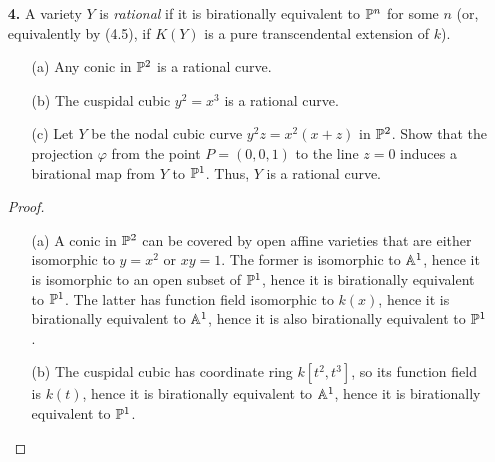 \documentclass{article}
\begin{document}
\begin{enumerate} [label=\textbf{\arabic*.}, leftmargin=0cm]
\begin{proof}
    If $\varphi : X \to Y$ is a rational map, then the set of open subsets of $X$ on which $\varphi$ is represented by morphism function is nonempty, and since $X$ is a noetherian space, there is a maximal element in this set. Then, the largest open subset $U$ of $X$ on which $\varphi$ is represented by a morphism is the union of maximal elements in this subset of open subsets.
\end{proof}

\item[\textbf{4.}] A variety $Y$ is \textit{rational} if it is birationally equivalent to $\mathbb{P}^n$ for some $n$ (or, equivalently by (4.5), if $K(Y)$ is a pure transcendental extension of $k$).
\begin{itemize}
    \item[(a)] Any conic in $\mathbb{P}^2$ is a rational curve.
    \item[(b)] The cuspidal cubic $y^2 = x^3$ is a rational curve.
    \item[(c)] Let $Y$ be the nodal cubic curve $y^2 z = x^2(x + z)$ in $\mathbb{P}^2$. Show that the projection $\varphi$ from the point $P = (0, 0, 1)$ to the line $z = 0$ induces a birational map from $Y$ to $\mathbb{P}^1$. Thus, $Y$ is a rational curve.
\end{itemize}

\begin{proof} $ $ \vspace{0pt}
    \begin{itemize} [leftmargin=0cm]
        \item[(a)] A conic in $\mathbb{P}^2$ can be covered by open affine varieties that are either isomorphic to $y = x^2$ or $xy = 1$.
        The former is isomorphic to $\mathbb{A}^1$, hence it is isomorphic to an open subset of $\mathbb{P}^1$, hence it is birationally equivalent to $\mathbb{P}^1$.
        The latter has function field isomorphic to $k(x)$, hence it is birationally equivalent to $\mathbb{A}^1$, hence it is also birationally equivalent to $\mathbb{P}^1$.

        \item[(b)] The cuspidal cubic has coordinate ring $k[t^2, t^3]$, so its function field is $k(t)$, hence it is birationally equivalent to $\mathbb{A}^1$, hence it is birationally equivalent to $\mathbb{P}^1$.


\end{itemize}
\end{proof}
\end{enumerate}
\end{document}
